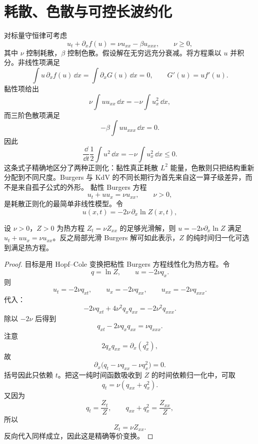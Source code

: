 \section{耗散、色散与可控长波约化}
\label{sec:dissipative-dispersive-regularization}
对标量守恒律可考虑
\begin{equation*}u_t+\partial_x f(u)
=\nu u_{xx}-\beta u_{xxx},
\qquad
\nu\ge0,\end{equation*}
其中 $\nu$ 控制耗散，$\beta$ 控制色散。假设解在无穷远充分衰减。将方程乘以 $u$ 并积分。非线性项满足
\[
\int u\,\partial_xf(u)\,\dd x
=
\int\partial_xG(u)\,\dd x=0,
\qquad
G'(u)=u f'(u).
\]
黏性项给出
\[
\nu\int u u_{xx}\,\dd x
=-\nu\int u_x^2\,\dd x,
\]
而三阶色散项满足
\[
-\beta\int u u_{xxx}\,\dd x=0.
\]
因此
\begin{equation*}\frac{\dd}{\dd t}
\frac12\int u^2\,\dd x
=-\nu\int u_x^2\,\dd x\le0.\end{equation*}
这条式子精确地区分了两种正则化：黏性真正耗散 $L^2$ 能量，色散则只把结构重新分配到不同尺度。Burgers 与 KdV 的不同长期行为首先来自这一算子级差异，而不是来自孤子公式的外形。
黏性 Burgers 方程
\begin{equation}
u_t+u u_x=\nu u_{xx},
\qquad \nu>0,
\label{eq:viscous-burgers}
\end{equation}
是耗散正则化的最简单非线性模型。令
\begin{equation}
u(x,t)=-2\nu\,\partial_x\ln Z(x,t),
\label{eq:hopf-cole-substitution}
\end{equation}

\begin{proposition}
设 $\nu>0$，$Z>0$ 为热方程 $Z_t=\nu Z_{xx}$ 的足够光滑解，则 $u=-2\nu\partial_x\ln Z$ 满足 $u_t+uu_x=\nu u_{xx}$。反之局部光滑 Burgers 解可如此表示，$Z$ 的纯时间归一化可选到满足热方程。
\end{proposition}
\begin{proof}
目标是用 Hopf--Cole 变换把粘性 Burgers 方程线性化为热方程。令
\[
q=\ln Z,
\qquad
u=-2\nu q_x.
\]
则
\[
u_t=-2\nu q_{xt},
\qquad
u_x=-2\nu q_{xx},
\qquad
u_{xx}=-2\nu q_{xxx}.
\]
代入：
\[
-2\nu q_{xt}
+4\nu^2q_xq_{xx}
=-2\nu^2q_{xxx}.
\]
除以 $-2\nu$ 后得到
\[
q_{xt}-2\nu q_xq_{xx}
=\nu q_{xxx}.
\]
注意
\[
2q_xq_{xx}=\partial_x(q_x^2),
\]
故
\[
\partial_x
\bigl(q_t-\nu q_{xx}-\nu q_x^2\bigr)=0.
\]
括号因此只依赖 $t$。把这一纯时间函数吸收到 $Z$ 的时间依赖归一化中，可取
\[
q_t=\nu(q_{xx}+q_x^2).
\]
又因为
\[
q_t=\frac{Z_t}{Z},
\qquad
q_{xx}+q_x^2=\frac{Z_{xx}}{Z},
\]
所以
\[
Z_t=\nu Z_{xx}.
\]
反向代入同样成立，因此这是精确等价变换。
\end{proof}

